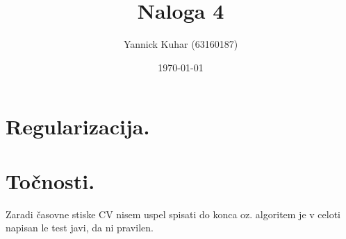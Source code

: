 \documentclass[11pt]{article}
\title{Naloga 4}
\author{Yannick Kuhar (63160187)}
\date{\today}
\begin{document}
\maketitle

\section{Regularizacija.}
\section{Točnosti.}
Zaradi časovne stiske CV nisem uspel spisati do konca oz. algoritem je v celoti napisan le test javi, da ni pravilen.
\end{document}
